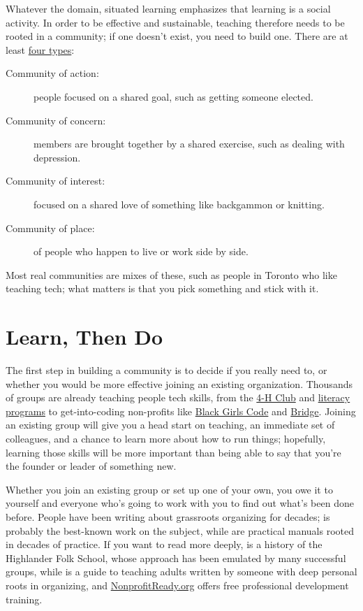 Whatever the domain, situated learning emphasizes that learning is a
social activity. In order to be effective and sustainable, teaching
therefore needs to be rooted in a community; if one doesn't exist, you
need to build one. There are at least \href{https://www.feverbee.com/types-of-community-and-activity-within-the-community/}{four types}:

\begin{description}
\item[Community of action:]
people focused on a shared goal, such as getting someone elected.
\item[Community of concern:]
members are brought together by a shared exercise, such as dealing
with depression.
\item[Community of interest:]
focused on a shared love of something like backgammon or knitting.
\item[Community of place:]
of people who happen to live or work side by side.
\end{description}

Most real communities are mixes of these, such as people in Toronto who
like teaching tech; what matters is that you pick something and stick
with it.

\section{Learn, Then Do}\label{s:community-learn-then-do}

The first step in building a community is to decide if you really need
to, or whether you would be more effective joining an existing
organization. Thousands of groups are already teaching people tech
skills, from the \href{http://www.4-h-canada.ca/}{4-H Club} and \href{https://www.frontiercollege.ca/}{literacy
programs} to get-into-coding non-profits like \href{http://www.blackgirlscode.com/}{Black
Girls Code} and \href{http://bridgeschool.io/}{Bridge}. Joining an
existing group will give you a head start on teaching, an immediate
set of colleagues, and a chance to learn more about how to run things;
hopefully, learning those skills will be more important than being
able to say that you're the founder or leader of something new.

Whether you join an existing group or set up one of your own, you owe
it to yourself and everyone who's going to work with you to find out
what's been done before. People have been writing about grassroots
organizing for decades; \cite{Alin1989} is probably the best-known
work on the subject, while \cite{Brow2007,Midw2010} are
practical manuals rooted in decades of practice. If you want to read
more deeply, \cite{Adam1975} is a history of the Highlander Folk
School, whose approach has been emulated by many successful groups,
while \cite{Spal2014} is a guide to teaching adults written by
someone with deep personal roots in organizing, and
\href{https://www.nonprofitready.org/}{NonprofitReady.org} offers free professional
development training.


